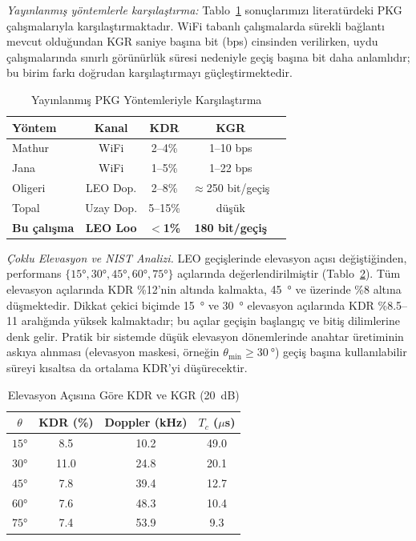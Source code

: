 \documentclass[conference,a4paper]{IEEEtran}
\begin{document}
\emph{Yayınlanmış yöntemlerle karşılaştırma:} Tablo~\ref{tab:litcomp} sonuçlarımızı literatürdeki PKG çalışmalarıyla karşılaştırmaktadır. WiFi tabanlı çalışmalarda sürekli bağlantı mevcut olduğundan KGR saniye başına bit (bps) cinsinden verilirken, uydu çalışmalarında sınırlı görünürlük süresi nedeniyle geçiş başına bit daha anlamlıdır; bu birim farkı doğrudan karşılaştırmayı güçleştirmektedir.

\begin{table}[t]
\caption{Yayınlanmış PKG Yöntemleriyle Karşılaştırma}
\label{tab:litcomp}
\centering
\begin{tabular}{>{\raggedright\arraybackslash}p{2.2cm}cccc}
\toprule
Yöntem & Kanal & KDR & KGR \\
\midrule
Mathur \cite{mathur} & WiFi & 2--4\% & 1--10 bps \\
Jana \cite{jana_eval} & WiFi & 1--5\% & 1--22 bps \\
Oligeri \cite{oligeri_sat} & LEO Dop. & 2--8\% & $\approx$250 bit/geçiş \\
Topal \cite{topal_doppler} & Uzay Dop. & 5--15\% & düşük \\
\textbf{Bu çalışma} & \textbf{LEO Loo} & \textbf{$<$1\%} & \textbf{180 bit/geçiş} \\
\bottomrule
\end{tabular}
\end{table}

\emph{Çoklu Elevasyon ve NIST Analizi.}
LEO geçişlerinde elevasyon açısı değiştiğinden, performans $\{15°, 30°, 45°, 60°, 75°\}$ açılarında değerlendirilmiştir (Tablo~\ref{tab:elev}). Tüm elevasyon açılarında KDR \%12'nin altında kalmakta, \SI{45}{\degree} ve üzerinde \%8 altına düşmektedir. Dikkat çekici biçimde \SI{15}{\degree} ve \SI{30}{\degree} elevasyon açılarında KDR \%8.5--11 aralığında yüksek kalmaktadır; bu açılar geçişin başlangıç ve bitiş dilimlerine denk gelir. Pratik bir sistemde düşük elevasyon dönemlerinde anahtar üretiminin askıya alınması (elevasyon maskesi, örneğin $\theta_{\min} \geq \SI{30}{\degree}$) geçiş başına kullanılabilir süreyi kısaltsa da ortalama KDR'yi düşürecektir.

\begin{table}[t]
\caption{Elevasyon Açısına Göre KDR ve KGR (\SI{20}{dB})}
\label{tab:elev}
\centering
\begin{tabular}{cccc}
\toprule
$\theta$ & KDR (\%) & Doppler (kHz) & $T_c$ ($\mu$s) \\
\midrule
$15°$ & 8.5 & 10.2 & 49.0 \\
$30°$ & 11.0 & 24.8 & 20.1 \\
$45°$ & 7.8 & 39.4 & 12.7 \\
$60°$ & 7.6 & 48.3 & 10.4 \\
$75°$ & 7.4 & 53.9 & 9.3 \\
\bottomrule
\end{tabular}
\end{table}
\end{document}
